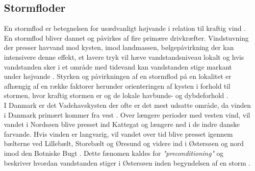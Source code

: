 
\subsection{Stormfloder} \label{Afsnit: Stormfloder}

En stormflod er betegnelsen for usædvanligt højvande i relation til kraftig vind \citep{shoreline_management_guidelines}. En stormflod bliver dannet og påvirkes af fire primære drivkræfter. Vindstuvning der presser havvand mod kysten, imod landmassen, bølgepåvirkning der kan intensivere denne effekt, et lavere tryk vil hæve vandstandsniveau lokalt og hvis vandstanden sker i et område med tidevand kan vandstanden stige markant under højvande \citep{piecuch_high-tide_2022}.
Styrken og påvirkningen af en stormflod på en lokalitet er afhængig af en række faktorer herunder orienteringen af kysten i forhold til stormen, hvor kraftig stormen er og de lokale havbunds- og dybdeforhold \citep{noaa_storm, shoreline_management_guidelines}. \\

I Danmark er det Vadehavskysten der ofte er det mest udsatte område, da vinden i Danmark primært kommer fra vest \citep{cappelen_dmi_2020}. Over længere perioder med vesten vind, vil vandet i Nordsøen blive presset ind Kattegat og længere ned i de indre danske farvande. Hvis vinden er langvarig, vil vandet over tid blive presset igennem bælterne ved Lillebælt, Storebælt og Øresund og videre ind i Østersøen og nord imod den Botniske Bugt \citep{kiesel_brief_2024, egusphere_baltic}. Dette fænomen kaldes for \textit{"preconditioning"} og beskriver hvordan vandstanden stiger i Østersøen inden begyndelsen af en storm \citep{kiesel_brief_2024, weisse_sea_2021}. \\   

